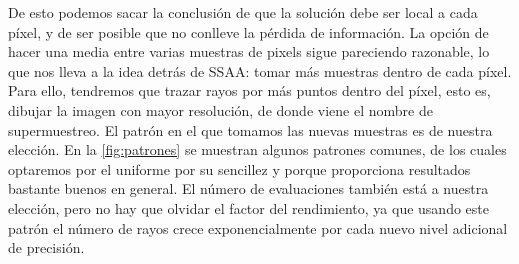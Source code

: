 De esto podemos sacar la conclusión de que la solución debe ser local a cada píxel, y de ser posible que no conlleve la pérdida de información. La opción de hacer una media entre varias muestras de pixels sigue pareciendo razonable, lo que nos lleva a la idea detrás de SSAA: tomar más muestras dentro de cada píxel. Para ello, tendremos que trazar rayos por más puntos dentro del píxel, esto es, dibujar la imagen con mayor resolución, de donde viene el nombre de supermuestreo. El patrón en el que tomamos las nuevas muestras es de nuestra elección. En la \autoref{fig:patrones} se muestran algunos patrones comunes, de los cuales optaremos por el uniforme por su sencillez y porque proporciona resultados bastante buenos en general. El número de evaluaciones también está a nuestra elección, pero no hay que olvidar el factor del rendimiento, ya que usando este patrón el número de rayos crece exponencialmente por cada nuevo nivel adicional de precisión.
\newline

